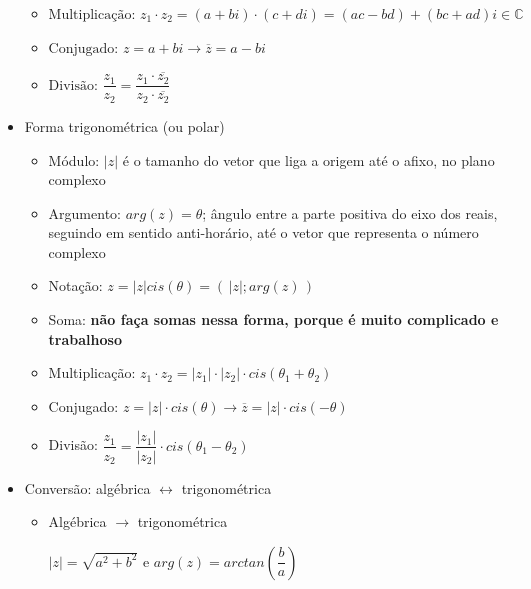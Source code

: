 \documentclass[a4paper, 11pt]{article}
\begin{document}
\begin{itemize}
\begin{itemize}
\item $ \textrm{Multiplicação: } z_1 \cdot z_2 = (a + bi) \cdot (c + di) = (ac - bd) + (bc + ad)i \in \mathbb{C}$

\item $ \textrm{Conjugado: } z = a + bi \longrightarrow \overline{z} = a - bi $

\item $ \textrm{Divisão: } \dfrac{z_1}{z_2} = \dfrac{ z_1 \cdot \overline{z_2} }{z_2 \cdot \overline{z_2}} $

	\end{itemize}

\item Forma trigonométrica (ou polar)


	\begin{itemize}
	
\item Módulo: $ |z| $ é o tamanho do vetor que liga a origem até o afixo, no plano complexo	

\item Argumento: $ arg(z) = \theta $; ângulo entre a parte positiva do eixo dos reais, seguindo em sentido anti-horário, até o vetor que representa o número complexo
	
\item Notação: $ z = |z|cis(\theta) = (\, |z| ; arg(z) \,)$

\item Soma: \textbf{não faça somas nessa forma, porque é muito complicado e trabalhoso}

\item Multiplicação: $z_1 \cdot z_2 = |z_1| \cdot |z_2| \cdot cis(\theta_1 + \theta_2) $

\item Conjugado: $z = |z| \cdot cis(\theta) \longrightarrow \overline{z} = |z| \cdot cis (-\theta) $

\item Divisão: $ \dfrac{z_1}{z_2} = \dfrac{|z_1|}{|z_2|} \cdot cis(\theta_1 - \theta_2) $

	\end{itemize}


\item Conversão: algébrica $\longleftrightarrow$ trigonométrica


	\begin{itemize}
	
\item Algébrica $\longrightarrow$ trigonométrica

$ |z| = \sqrt{a^2 + b^2} $ e $ arg(z) = arctan (\dfrac{b}{a}) $


\end{itemize}
\end{itemize}
\end{document}
